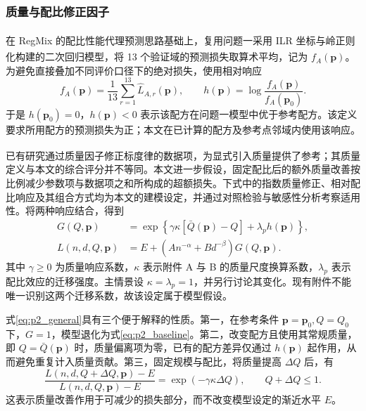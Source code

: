 \documentclass[bwprint]{gmcmthesis}
\begin{document}
        \subsubsection{质量与配比修正因子}  %
        在 RegMix 的配比性能代理预测思路基础上\textsuperscript{\cite{liu2025regmix}}，复用问题一采用 ILR 坐标与岭正则化构建的二次回归模型\textsuperscript{\cite{egozcue2003ilr,hoerl1970ridge}}，将 13 个验证域的预测损失取算术平均，记为 $f_A(\bm p)$。为避免直接叠加不同评价口径下的绝对损失，使用相对响应
        \begin{equation}
         f_A(\bm p)=\frac1{13}\sum_{r=1}^{13}\widehat L_{A,r}(\bm p),
         \qquad h(\bm p)=\log\frac{f_A(\bm p)}{f_A(\bm p_0)}.
         \label{eq:p2_mix}
        \end{equation}
        于是 $h(\bm p_0)=0$，$h(\bm p)<0$ 表示该配方在问题一模型中优于参考配方。该定义要求所用配方的预测损失为正；本文在已计算的配方及参考点邻域内使用该响应。
        
        已有研究通过质量因子修正标度律的数据项\textsuperscript{\cite{subramanyam2026quality}}，为显式引入质量提供了参考；其质量定义与本文的综合评分并不等同。本文进一步假设，固定配比后的额外质量改善按比例减少参数项与数据项之和所构成的超额损失。下式中的指数质量修正、相对配比响应及其组合方式均为本文的建模设定，并通过对照检验与敏感性分析考察适用性。将两种响应结合，得到
        \begin{equation}
         \begin{aligned}
         G(Q,\bm p)&=\exp\!\left\{\gamma\kappa[\bar Q(\bm p)-Q]+\lambda_p h(\bm p)\right\},\\
         L(n,d,Q,\bm p)&=E+\left(A n^{-\alpha}+B d^{-\beta}\right)G(Q,\bm p).
         \end{aligned}
         \label{eq:p2_general}
        \end{equation}
        其中 $\gamma\geq0$ 为质量响应系数，$\kappa$ 表示附件 A 与 B 的质量尺度换算系数，$\lambda_p$ 表示配比效应的迁移强度。主情景设 $\kappa=\lambda_p=1$，并另行讨论其变化。现有附件不能唯一识别这两个迁移系数，故该设定属于模型假设。
        
        式\eqref{eq:p2_general}具有三个便于解释的性质。第一，在参考条件 $\bm p=\bm p_0,Q=Q_0$ 下，$G=1$，模型退化为式\eqref{eq:p2_baseline}。第二，改变配方且使用其常规质量，即 $Q=\bar Q(\bm p)$ 时，质量偏离项为零，已有的配方差异仅通过 $h(\bm p)$ 起作用，从而避免重复计入质量贡献。第三，固定规模与配比，将质量提高 $\Delta Q$ 后，有
        \begin{equation}
         \frac{L(n,d,Q+\Delta Q,\bm p)-E}{L(n,d,Q,\bm p)-E}
         =\exp(-\gamma\kappa\Delta Q),\qquad Q+\Delta Q\leq1.
         \label{eq:p2_qchange}
        \end{equation}
        这表示质量改善作用于可减少的损失部分，而不改变模型设定的渐近水平 $E$。
        
\end{document}
